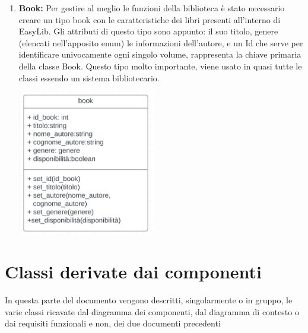 \documentclass{article}
\begin{document}
\begin{enumerate}
    \item \textbf{Book:} Per gestire al meglio le funzioni della biblioteca è stato necessario creare un tipo book con le caratteristiche  dei libri presenti all’interno di EasyLib.
Gli attributi di questo tipo sono appunto: il suo titolo, genere (elencati nell’apposito enum) le informazioni dell’autore, e un Id che serve per identificare univocamente ogni singolo volume, rappresenta la chiave primaria della classe Book. Questo tipo molto importante, viene usato in quasi tutte le classi essendo un sistema bibliotecario.
    \begin{center}
        \includegraphics[width=60mm]{D3/Images/Book.png}
    \end{center}    
\end{enumerate}

\section{Classi derivate dai componenti}
In questa parte del documento vengono descritti, singolarmente o in gruppo, le varie classi ricavate dal diagramma dei componenti, dal diagramma di contesto o dai requisiti funzionali e non, dei due documenti precedenti
\end{document}
